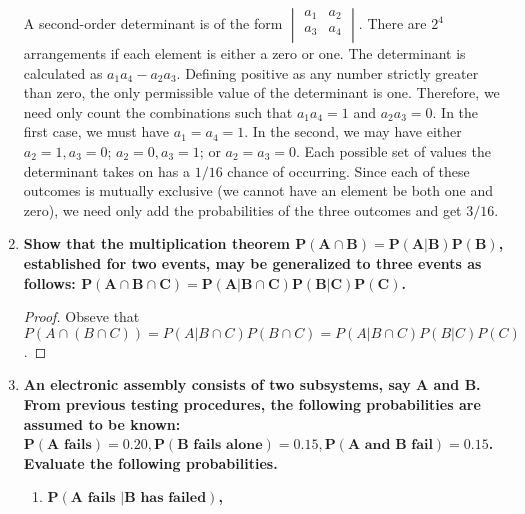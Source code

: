 \documentclass[10pt, oneside]{article}   	%
\theoremstyle{definition}
\begin{document}
\begin{enumerate}[label=3.\arabic*]
A second-order determinant is of the form $   \begin{vmatrix} %
      a_1 & a_2 \\
      a_3 & a_4 \\
   \end{vmatrix}$. There are $2^4$ arrangements if each element is either a zero or one. The determinant is calculated as $a_1 a_4 - a_2 a_3$. Defining positive as any number strictly greater than zero, the only permissible value of the determinant is one. Therefore, we need only count the combinations such that $a_1 a_4 = 1$ and $a_2 a_3 = 0$. In the first case, we must have $a_1 = a_4 = 1$. In the second, we may have either $a_2 = 1, a_3 = 0$; $a_2 = 0, a_3 = 1$; or $a_2 = a_3 = 0$. Each possible set of values the determinant takes on has a $1/16$ chance of occurring. Since each of these outcomes is mutually exclusive (we cannot have an element be both one and zero), we need only add the probabilities of the three outcomes and get $\boxed{3/16}$.
   
\item  \begin{tcolorbox}[
  colback=Cerulean!5!white,
  colframe=Cerulean!75!black]
\textbf{Show that the multiplication theorem $\bm{P(A \cap B) = P(A | B) P(B)}$, established for two events, may be generalized to three events as follows: $\bm{P(A \cap B \cap C) = P(A | B \cap C) P(B | C) P(C)}$.}
\end{tcolorbox}

\begin{proof} Obseve that $P(A \cap (B \cap C)) = P(A | B \cap C) P(B \cap C) = P(A | B \cap C) P(B | C) P(C)$.
\end{proof}

\item  \begin{tcolorbox}[
  colback=Cerulean!5!white,
  colframe=Cerulean!75!black]
\textbf{An electronic assembly consists of two subsystems, say $\bm{A}$ and $\bm{B}$. From previous testing procedures, the following probabilities are assumed to be known: $\bm{P(A \text{ fails}) = 0.20, P(B \text{ fails alone}) = 0.15, P(A \text{ and } B \text{ fail}) = 0.15}$. Evaluate the following probabilities.}
\end{tcolorbox}

	\begin{enumerate}
	\item  \begin{tcolorbox}[
	  colback=Cerulean!5!white,
	  colframe=Cerulean!75!black]
	\textbf{$\bm{P(A \text{ fails } | B \text{ has failed})}$,}
	\end{tcolorbox}
	

\end{enumerate}
\end{enumerate}
\end{document}
